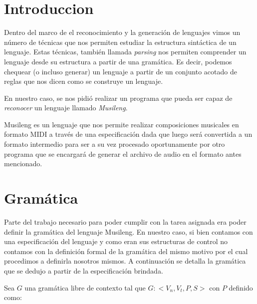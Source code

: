 \section{Introduccion}

Dentro del marco de el reconocimiento y la generación de lenguajes vimos un número de técnicas que nos permiten
estudiar la estructura sintáctica de un lenguaje. Estas técnicas, también llamada \emph{parsing} nos permiten
comprender un lenguaje desde su estructura a partir de una gramática. Es decir, podemos chequear (o incluso generar)
un lenguaje a partir de un conjunto acotado de reglas que nos dicen como se construye un lenguaje.

En nuestro caso, se nos pidió realizar un programa que pueda ser capaz de \emph{reconocer} un lenguaje llamado \emph{Musileng}.

Musileng es un lenguaje que nos permite realizar composiciones musicales en formato MIDI a través de una especificación dada que luego
será convertida a un formato intermedio para ser a su vez procesado oportunamente por otro programa que se encargará de generar el archivo
de audio en el formato antes mencionado.

\section{Gramática}

Parte del trabajo necesario para poder cumplir con la tarea asignada era poder definir la gramática del lenguaje Musileng.
En nuestro caso, si bien contamos con una especificación del lenguaje y como eran sus estructuras de control no contamos con la definición
formal de la gramática del mismo motivo por el cual procedimos a definirla nosotros mismos. A continuación se detalla la gramática que
se dedujo a partir de la especificación brindada.

Sea $G$ una gramática libre de contexto tal que $G: <V_n, V_t, P, S>$ con $P$ definido como: 

